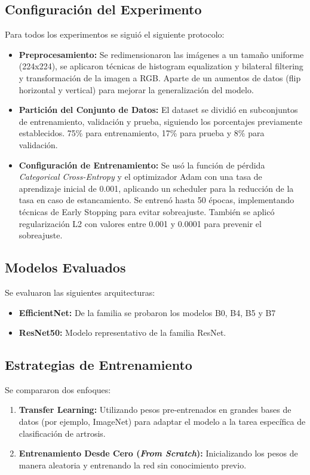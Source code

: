 \documentclass[11pt,spanish,listoffigures,listoftables]{tfgetsinf}
\begin{document}
\subsection{Configuración del Experimento}
Para todos los experimentos se siguió el siguiente protocolo:
\begin{itemize}
    \item \textbf{Preprocesamiento:} Se redimensionaron las imágenes a un tamaño uniforme (224x224), se aplicaron técnicas de histogram equalization y bilateral filtering y transformación de la imagen a RGB. Aparte de un aumentos de datos (flip horizontal y vertical) para mejorar la generalización del modelo.
    \item \textbf{Partición del Conjunto de Datos:} El dataset se dividió en subconjuntos de entrenamiento, validación y prueba, siguiendo los porcentajes previamente establecidos. 75\% para entrenamiento, 17\% para prueba y 8\% para validación.
    \item \textbf{Configuración de Entrenamiento:} Se usó la función de pérdida \textit{Categorical Cross-Entropy} y el optimizador Adam con una tasa de aprendizaje inicial de 0.001, aplicando un scheduler para la reducción de la tasa en caso de estancamiento. Se entrenó hasta 50 épocas, implementando técnicas de Early Stopping para evitar sobreajuste. También se aplicó regularización L2 con valores entre 0.001 y 0.0001 para prevenir el sobreajuste.
\end{itemize}

\subsection{Modelos Evaluados}
Se evaluaron las siguientes arquitecturas:
\begin{itemize}
    \item \textbf{EfficientNet:} De la familia se probaron los modelos B0, B4, B5 y B7
    \item \textbf{ResNet50:} Modelo representativo de la familia ResNet.
\end{itemize}

\subsection{Estrategias de Entrenamiento}
Se compararon dos enfoques:
\begin{enumerate}
    \item \textbf{Transfer Learning:} Utilizando pesos pre-entrenados en grandes bases de datos (por ejemplo, ImageNet) para adaptar el modelo a la tarea específica de clasificación de artrosis.
    \item \textbf{Entrenamiento Desde Cero (\textit{From Scratch}):} Inicializando los pesos de manera aleatoria y entrenando la red sin conocimiento previo.
\end{enumerate}
\end{document}
